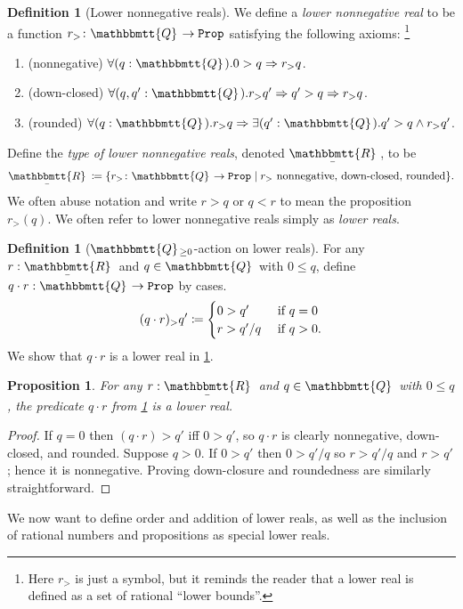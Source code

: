 \documentclass[11pt, oneside, article]{memoir}
\theoremstyle{plain}
\newtheorem{proposition}[theorem]{Proposition}
\theoremstyle{definition}
\newtheorem{definition}[theorem]{Definition}
\theoremstyle{remark}
\newcommand{\const}[1]{\mathtt{#1}}
\newcommand{\tn}[1]{\textnormal{#1}}
\newcommand{\ubar}[1]{\underaccent{\bar}{#1}}
\newcommand{\internal}[1]{\raisebox{-.03ex}{$\mathbbmtt{#1}$}}
\newcommand{\hs}{\hspace{1.1pt}}
\newcommand{\tqq}{\internal{Q}\hs}
\newcommand{\trr}{\internal{R}\hs}
\newcommand{\tlrr}{\ubar{\trr}\hs}
\newcommand{\prop}{\const{Prop}}
\newcommand{\imp}{\Rightarrow}
\begin{document}
\begin{definition}[Lower nonnegative reals]\label{def.lower_nn_reals}
We define a \emph{lower nonnegative real} to be a function $r_>\colon\tqq\to\prop$ satisfying the following axioms:%
\footnote{Here $r_>$ is just a symbol, but it reminds the reader that a lower real is defined as a set of rational ``lower bounds''.}
\begin{enumerate}
	\item (nonnegative) $\forall(q:\tqq).0>q\imp r_>q$.
	\item (down-closed) $\forall(q,q':\tqq). r_>q'\imp q'>q\imp r_>q$.
	\item (rounded) $\forall (q:\tqq).r_>q\imp\exists (q':\tqq).q'>q\wedge r_>q'$.
\end{enumerate}
Define the \emph{type of lower nonnegative reals}, denoted $\tlrr$, to be
\[\tlrr\coloneqq\{r_>\colon\tqq\to\prop\mid r_>\tn{ nonnegative, down-closed, rounded}\}.
\]
We often abuse notation and write $r>q$ or $q<r$ to mean the proposition $r_>(q)$. We often refer to lower nonnegative reals simply as \emph{lower reals}.
\end{definition}

\begin{definition}[$\tqq_{\geq0}$-action on lower reals]\label{def.Q_action}
For any $r:\tlrr$ and $q\in\tqq$ with $0\leq q$, define $q\cdot r:\tqq\to\prop$ by cases.
\[
(q\cdot r)_>q'\coloneqq
\begin{cases}
	0>q'&\tn{ if }q=0\\
	r>q'/q&\tn{ if }q>0.
\end{cases}
\]
We show that $q\cdot r$ is a lower real in \cref{prop.Q_action_lower_real}.
\end{definition}

\begin{proposition}\label{prop.Q_action_lower_real}
For any $r:\tlrr$ and $q\in\tqq$ with $0\leq q$, the predicate $q\cdot r$ from \cref{def.Q_action} is a lower real.
\end{proposition}
\begin{proof}
If $q=0$ then $(q\cdot r)>q'$ iff $0>q'$, so $q\cdot r$ is clearly nonnegative, down-closed, and rounded. Suppose $q>0$. If $0>q'$ then $0>q'/q$ so $r>q'/q$ and $r>q'$; hence it is nonnegative. Proving down-closure and roundedness are similarly straightforward.
\end{proof}

We now want to define order and addition of lower reals, as well as the inclusion of rational numbers and propositions as special lower reals.
\end{document}
